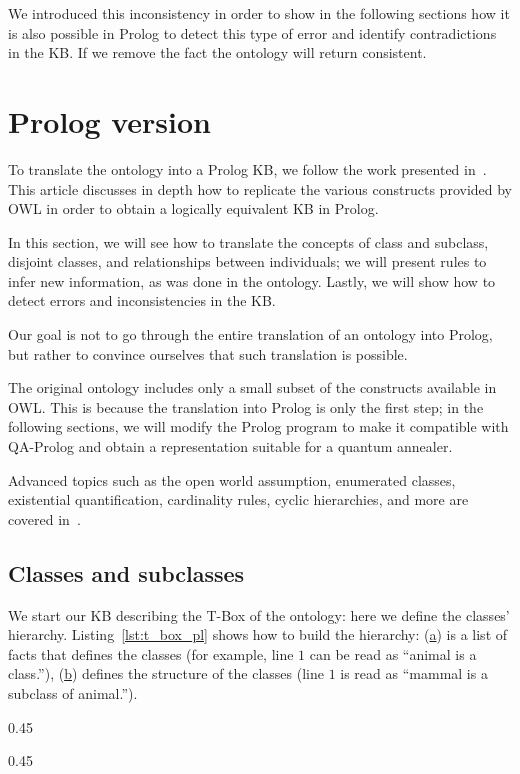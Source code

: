 We introduced this inconsistency in order to show \textemdash{}in the following sections\textemdash{} how it is also possible in Prolog to detect this type of error and identify contradictions in the KB. If we remove the fact  the ontology will return consistent.

\section{Prolog version}
To translate the ontology into a Prolog KB, we follow the work presented in~\cite{samuel2008translating}. This article discusses in depth how to replicate the various constructs provided by OWL in order to obtain a logically equivalent KB in Prolog.

In this section, we will see how to translate the concepts of class and subclass, disjoint classes, and relationships between individuals; we will present rules to infer new information, as was done in the ontology. Lastly, we will show how to detect errors and inconsistencies in the KB.

Our goal is not to go through the entire translation of an ontology into Prolog, but rather to convince ourselves that such translation is possible.

The original ontology includes only a small subset of the constructs available in OWL. This is because the translation into Prolog is only the first step; in the following sections, we will modify the Prolog program to make it compatible with QA-Prolog and obtain a representation suitable for a quantum annealer.

Advanced topics such as the open world assumption, enumerated classes, existential quantification, cardinality rules, cyclic hierarchies, and  more are covered in~\cite{samuel2008translating}.

\subsection{Classes and subclasses}
We start our KB describing the T-Box of the ontology: here we define the classes' hierarchy. Listing~\ref{lst:t_box_pl} shows how to build the hierarchy: (\hyperref[lst:t_box_pl_class]{a}) is a list of facts that defines the classes (for example, line $1$ can be read as “animal is a class.”), (\hyperref[lst:t_box_pl_subclass]{b}) defines the structure of the classes (line $1$ is read as “mammal is a subclass of animal.”).

\begin{listingenv}[h]
	\centering
	\begin{sublisting}[c]{0.45\linewidth}
		\caption{Classes definitions}
		\label{lst:t_box_pl_class}
	\end{sublisting}
	\qquad
	\begin{sublisting}[c]{0.45\linewidth}
		\caption{Subclasses definitions}
		\label{lst:t_box_pl_subclass}
	\end{sublisting}
	\caption{T-Box definition}
	\label{lst:t_box_pl}
\end{listingenv}

